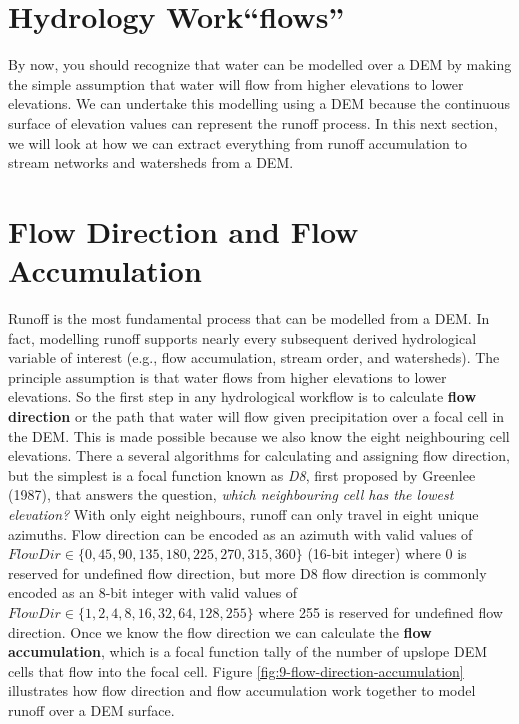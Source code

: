 \documentclass[
]{book}
\begin{document}
\hypertarget{hydrology-workflows}{%
\section{Hydrology Work``flows''}\label{hydrology-workflows}}

By now, you should recognize that water can be modelled over a DEM by making the simple assumption that water will flow from higher elevations to lower elevations. We can undertake this modelling using a DEM because the continuous surface of elevation values can represent the runoff process. In this next section, we will look at how we can extract everything from runoff accumulation to stream networks and watersheds from a DEM.

\hypertarget{flow-direction-and-flow-accumulation}{%
\section{Flow Direction and Flow Accumulation}\label{flow-direction-and-flow-accumulation}}

Runoff is the most fundamental process that can be modelled from a DEM. In fact, modelling runoff supports nearly every subsequent derived hydrological variable of interest (e.g., flow accumulation, stream order, and watersheds). The principle assumption is that water flows from higher elevations to lower elevations. So the first step in any hydrological workflow is to calculate \textbf{flow direction} or the path that water will flow given precipitation over a focal cell in the DEM. This is made possible because we also know the eight neighbouring cell elevations. There a several algorithms for calculating and assigning flow direction, but the simplest is a focal function known as \emph{D8}, first proposed by Greenlee (1987), that answers the question, \emph{which neighbouring cell has the lowest elevation?} With only eight neighbours, runoff can only travel in eight unique azimuths. Flow direction can be encoded as an azimuth with valid values of \(FlowDir∈\{0,45,90,135,180,225,270,315,360\}\) (16-bit integer) where 0 is reserved for undefined flow direction, but more D8 flow direction is commonly encoded as an 8-bit integer with valid values of \(FlowDir∈\{1,2,4,8,16,32,64,128,255\}\) where 255 is reserved for undefined flow direction. Once we know the flow direction we can calculate the \textbf{flow accumulation}, which is a focal function tally of the number of upslope DEM cells that flow into the focal cell. Figure \ref{fig:9-flow-direction-accumulation} illustrates how flow direction and flow accumulation work together to model runoff over a DEM surface.
\end{document}
